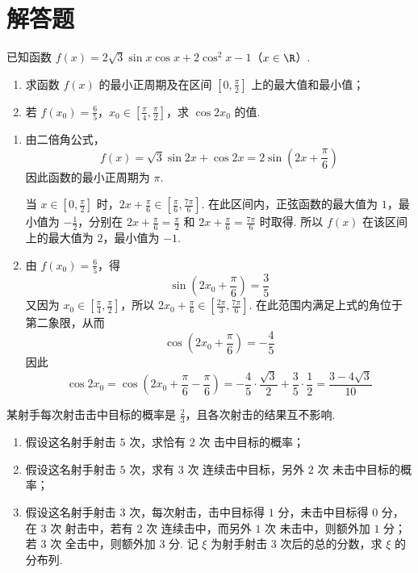 \section{解答题}

\begin{problem}
已知函数 \( f(x) = 2\sqrt{3}\sin x\cos x + 2\cos^2 x - 1 \)（\(x \in \R\)）.
\begin{enumerate}
\item 求函数 \( f(x) \) 的最小正周期及在区间 \( \left[0, \frac{\pi}{2}\right] \) 上的最大值和最小值；
\item 若 \(f(x_{0})=\frac{6}{5}\)，\(x_{0}\in\left[\frac{\pi}{4},\frac{\pi}{2}\right]\)，求 \( \cos 2x_{0} \) 的值.
\end{enumerate}
\end{problem}

\begin{solution}
\begin{enumerate}
\item 由二倍角公式，
\[
f(x)=\sqrt{3}\sin 2x+\cos 2x=2\sin\left(2x+\frac{\pi}{6}\right)
\]
因此函数的最小正周期为 \(\pi\).

当 \(x\in\left[0,\frac{\pi}{2}\right]\) 时，\(2x+\frac{\pi}{6}\in\left[\frac{\pi}{6},\frac{7\pi}{6}\right]\). 在此区间内，正弦函数的最大值为 \(1\)，最小值为 \(-\frac{1}{2}\)，分别在 \(2x+\frac{\pi}{6}=\frac{\pi}{2}\) 和 \(2x+\frac{\pi}{6}=\frac{7\pi}{6}\) 时取得. 所以 \(f(x)\) 在该区间上的最大值为 \(2\)，最小值为 \(-1\).
\item 由 \(f(x_0)=\frac{6}{5}\)，得
\[
\sin\left(2x_0+\frac{\pi}{6}\right)=\frac{3}{5}
\]
又因为 \(x_0\in\left[\frac{\pi}{4},\frac{\pi}{2}\right]\)，所以 \(2x_0+\frac{\pi}{6}\in\left[\frac{2\pi}{3},\frac{7\pi}{6}\right]\). 在此范围内满足上式的角位于第二象限，从而
\[
\cos\left(2x_0+\frac{\pi}{6}\right)=-\frac{4}{5}
\]
因此
\[
\cos 2x_0=\cos\left(2x_0+\frac{\pi}{6}-\frac{\pi}{6}\right)=-\frac{4}{5}\cdot\frac{\sqrt{3}}{2}+\frac{3}{5}\cdot\frac{1}{2}=\frac{3-4\sqrt{3}}{10}
\]
\end{enumerate}
\end{solution}

\begin{problem}
某射手每次射击击中目标的概率是 \(\frac{2}{3}\)，且各次射击的结果互不影响.
\begin{enumerate}
\item 假设这名射手射击 \(5\text{ 次}\)，求恰有 \(2\text{ 次}\) 击中目标的概率；
\item 假设这名射手射击 \(5\text{ 次}\)，求有 \(3\text{ 次}\) 连续击中目标，另外 \(2\text{ 次}\) 未击中目标的概率；
\item 假设这名射手射击 \(3\text{ 次}\)，每次射击，击中目标得 \(1\text{ 分}\)，未击中目标得 \(0\text{ 分}\)，在 \(3\text{ 次}\) 射击中，若有 \(2\text{ 次}\) 连续击中，而另外 \(1\text{ 次}\) 未击中，则额外加 \(1\text{ 分}\)；若 \(3\text{ 次}\) 全击中，则额外加 \(3\text{ 分}\). 记 \(\xi\) 为射手射击 \(3\text{ 次}\)后的总的分数，求 \(\xi\) 的分布列.
\end{enumerate}
\end{problem}

